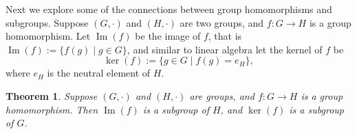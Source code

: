 \documentclass{article}
\theoremstyle{plain}
\newtheorem{theorem}{Theorem}
\theoremstyle{definition}
\renewcommand{\Im}{\operatorname{Im}}
\begin{document}
Next we explore some of the connections between
group homomorphisms and subgroups. Suppose $(G,\cdot)$
and $(H,\cdot)$ are two groups, and $f:G\to H$
is a group homomorphism. Let $\Im(f)$ be the image
of $f$, that is $\Im(f):=\{f(g)\mid g\in G\}$,
and similar to linear algebra let the kernel of $f$ be 
\[\ker(f):=\{g\in G\mid f(g)=e_H\},\]
where $e_H$ is the neutral element of $H$.

\begin{theorem}
    Suppose $(G,\cdot)$ and $(H,\cdot)$ are groups,
    and $f:G\to H$ is a group homomorphism.
    Then $\Im(f)$ is a subgroup of $H$,
    and $\ker(f)$ is a subgroup of $G$.
\end{theorem}
\end{document}

